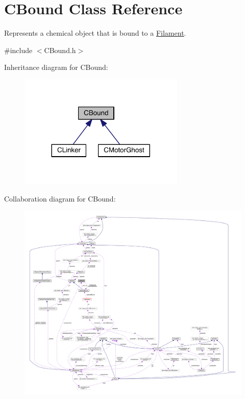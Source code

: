 \hypertarget{classCBound}{\section{C\+Bound Class Reference}
\label{classCBound}
}


Represents a chemical object that is bound to a \hyperlink{classFilament}{Filament}.  




{\ttfamily \#include $<$C\+Bound.\+h$>$}



Inheritance diagram for C\+Bound\+:\nopagebreak
\begin{figure}[H]
\begin{center}
\leavevmode
\includegraphics[width=224pt]{classCBound__inherit__graph}
\end{center}
\end{figure}


Collaboration diagram for C\+Bound\+:
\nopagebreak
\begin{figure}[H]
\begin{center}
\leavevmode
\includegraphics[width=350pt]{classCBound__coll__graph}
\end{center}
\end{figure}

